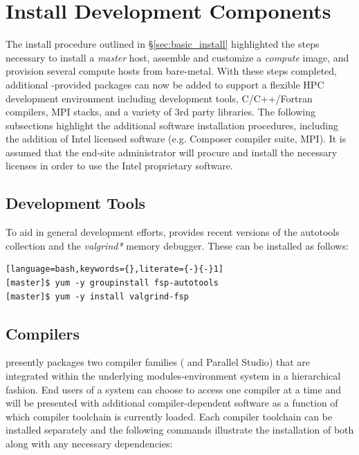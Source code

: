 \documentclass[letterpaper]{article}
\begin{document}
\section{Install \FSP{} Development Components}

The install procedure outlined in \S\ref{sec:basic_install}
highlighted the steps necessary to install a {\em master} host,
assemble and customize a {\em compute} image, and provision several
compute hosts from bare-metal.  With these steps completed, 
additional \FSP{}-provided packages can now be added to support a flexible HPC
development environment including development tools, C/C++/Fortran compilers,
MPI stacks, and a variety of 3rd party libraries. The following subsections
highlight the additional software installation procedures, including the
addition of Intel licensed software (e.g. Composer compiler suite, \Intel{}
MPI). It is assumed that the end-site administrator will procure and install
the necessary licenses in order to use the Intel proprietary software.

\subsection{Development Tools}

To aid in general development efforts, \FSP{} provides recent versions of the \GNU{}
autotools collection and the {\em valgrind*} memory debugger. These can be installed as follows:

\begin{lstlisting}[language=bash,keywords={},literate={-}{-}1]
[master]$ yum -y groupinstall fsp-autotools
[master]$ yum -y install valgrind-fsp
\end{lstlisting}

\subsection{Compilers}

\FSP{} presently packages two compiler families ({\GNU{}} and {\Intel{}
  Parallel Studio}) that are integrated within the underlying
modules-environment system in a hierarchical fashion. End users of a \FSP{}
system can choose to access one compiler at a time and will be presented with
additional compiler-dependent software as a function of which compiler
toolchain is currently loaded. Each compiler toolchain can be installed
separately and the following commands illustrate the installation of both along
with any necessary dependencies:
\end{document}
